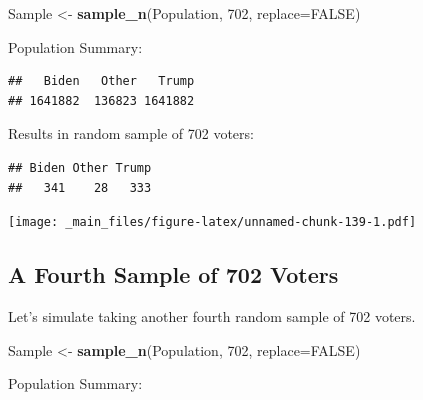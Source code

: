 \documentclass[]{book}
\newenvironment{Shaded}{\begin{snugshade}}{\end{snugshade}}
\newcommand{\KeywordTok}[1]{\textcolor[rgb]{0.13,0.29,0.53}{\textbf{#1}}}
\newcommand{\DataTypeTok}[1]{\textcolor[rgb]{0.13,0.29,0.53}{#1}}
\newcommand{\DecValTok}[1]{\textcolor[rgb]{0.00,0.00,0.81}{#1}}
\newcommand{\StringTok}[1]{\textcolor[rgb]{0.31,0.60,0.02}{#1}}
\newcommand{\OtherTok}[1]{\textcolor[rgb]{0.56,0.35,0.01}{#1}}
\newcommand{\OperatorTok}[1]{\textcolor[rgb]{0.81,0.36,0.00}{\textbf{#1}}}
\newcommand{\NormalTok}[1]{#1}
\begin{document}
\begin{Shaded}
\begin{Highlighting}[]
\NormalTok{Sample <-}\StringTok{ }\KeywordTok{sample_n}\NormalTok{(Population, }\DecValTok{702}\NormalTok{, }\DataTypeTok{replace=}\OtherTok{FALSE}\NormalTok{)}
\end{Highlighting}
\end{Shaded}

Population Summary:

\begin{Shaded}
\end{Shaded}

\begin{verbatim}
##   Biden   Other   Trump 
## 1641882  136823 1641882
\end{verbatim}

Results in random sample of 702 voters:

\begin{Shaded}
\end{Shaded}

\begin{verbatim}
## Biden Other Trump 
##   341    28   333
\end{verbatim}

\texttt{[image: \_main\_files/figure-latex/unnamed-chunk-139-1.pdf]}

\subsection{A Fourth Sample of 702
Voters}\label{a-fourth-sample-of-702-voters}

Let's simulate taking another fourth random sample of 702 voters.

\begin{Shaded}
\begin{Highlighting}[]
\NormalTok{Sample <-}\StringTok{ }\KeywordTok{sample_n}\NormalTok{(Population, }\DecValTok{702}\NormalTok{, }\DataTypeTok{replace=}\OtherTok{FALSE}\NormalTok{)}
\end{Highlighting}
\end{Shaded}

Population Summary:
\end{document}
